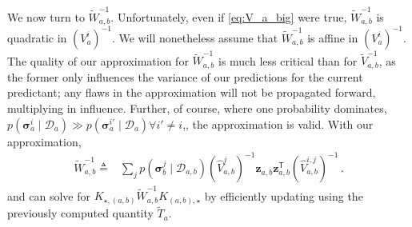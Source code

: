 \documentclass{article}
\newcommand{\psff}[1]{\texttt{[image: \#1.eps]}}
\newcommand{\given}{\ensuremath{\mid}}
\newcommand{\cm}[1]{\ensuremath{\mathcal{#1}}}
\newcommand{\bm}[1]{\ensuremath{\mathbf{#1}}}
\newcommand{\data}{\ensuremath{\cm{D}}}
\newcommand{\vect}[1]{\bm{#1}}
\newcommand{\vz}{\vect{z}}
\newcommand{\vs}{\vect{\sigma}}
\newcommand{\fPr}{p}
\newcommand{\Prob}[2]{\fPr(#1 \given #2 )}
\newcommand{\tr}{\ensuremath{\mathsf{T}}}
\newcommand{\defequal}{\triangleq}
\begin{document}
We now turn to $\tilde{W}_{a,b}^{-1}$. Unfortunately, even if
\eqref{eq:V_a_big} were true, $\tilde{W}_{a,b}^{-1}$ is quadratic in
$(V^i_a)^{-1}$. We will nonetheless assume that $\tilde{W}_{a,b}^{-1}$
is affine in $(V^i_a)^{-1}$. The quality of our approximation for
$\tilde{W}_{a,b}^{-1}$ is much less critical than for
$\tilde{V}^{-1}_{a,b}$, as the former only influences the variance of
our predictions for the current predictant; any flaws in the
approximation will not be propagated forward, multiplying in
influence. Further, of course, where one probability dominates,
$\Prob{\vs^i_{a}}{\data_{a}}\gg \Prob{\vs^{i'}_{a}}{\data_{a}} \forall
i' \neq i$,, the approximation is valid. With our approximation,
\begin{align}
\tilde{W}^{-1}_{a,b} \defequal
& \sum_{j} \Prob{\vs^j_{b}}{\data_{a,b}} (\hat{V}_{a,b}^{j})^{-1}\vz_{a,b}^{\phantom{\tr}} \vz_{a,b}^\tr (\hat{V}_{a,b}^{i,j})^{-1}\,.\label{eq:Wab}
\end{align}
and can solve for $K_{\star,(a,b)}\tilde{W}^{-1}_{a,b}K_{(a,b),\star}$ by efficiently updating using the previously computed quantity $\tilde{T}_{a}$.

\end{document}
